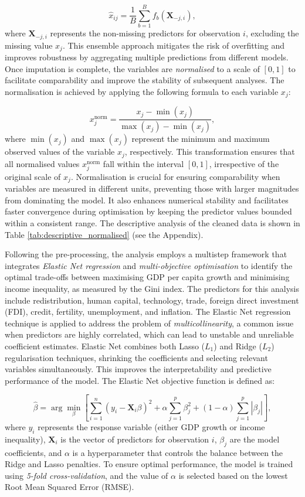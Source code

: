 \[
\hat{x}_{ij} = \frac{1}{B} \sum_{b=1}^{B} f_b(\mathbf{X}_{-j,i}),
\]
where \(\mathbf{X}_{-j,i}\) represents the non-missing predictors for observation \(i\), excluding the missing value \(x_j\). This ensemble approach mitigates the risk of overfitting and improves robustness by aggregating multiple predictions from different models. 
Once imputation is complete, the variables are \textit{normalised} to a scale of \([0, 1]\) to facilitate comparability and improve the stability of subsequent analyses. The normalisation is achieved by applying the following formula to each variable \(x_j\):

\[
x_j^{\text{norm}} = \frac{x_j - \min(x_j)}{\max(x_j) - \min(x_j)},
\]
where \(\min(x_j)\) and \(\max(x_j)\) represent the minimum and maximum observed values of the variable \(x_j\), respectively. This transformation ensures that all normalised values \(x_j^{\text{norm}}\) fall within the interval \([0, 1]\), irrespective of the original scale of \(x_j\). Normalisation is crucial for ensuring comparability when variables are measured in different units, preventing those with larger magnitudes from dominating the model. It also enhances numerical stability and facilitates faster convergence during optimisation by keeping the predictor values bounded within a consistent range. The descriptive analysis of the cleaned data is shown in Table \ref{tab:descriptive_normalised} (see the Appendix).

Following the pre-processing, the analysis employs a multistep framework that integrates \textit{Elastic Net regression} and \textit{multi-objective optimisation} to identify the optimal trade-offs between maximising GDP per capita growth and minimising income inequality, as measured by the Gini index. The predictors for this analysis include redistribution, human capital, technology, trade, foreign direct investment (FDI), credit, fertility, unemployment, and inflation. The Elastic Net regression technique is applied to address the problem of \textit{multicollinearity}, a common issue when predictors are highly correlated, which can lead to unstable and unreliable coefficient estimates. Elastic Net combines both Lasso (\(L_1\)) and Ridge (\(L_2\)) regularisation techniques, shrinking the coefficients and selecting relevant variables simultaneously. This improves the interpretability and predictive performance of the model. The Elastic Net objective function is defined as:

\[
\hat{\beta} = \arg \min_{\beta} \left[ \sum_{i=1}^{n} \left( y_i - \mathbf{X}_i \beta \right)^2 + \alpha \sum_{j=1}^{p} \beta_j^2 + (1-\alpha) \sum_{j=1}^{p} |\beta_j| \right],
\]
where \(y_i\) represents the response variable (either GDP growth or income inequality), \(\mathbf{X}_i\) is the vector of predictors for observation \(i\), \(\beta_j\) are the model coefficients, and \(\alpha\) is a hyperparameter that controls the balance between the Ridge and Lasso penalties. To ensure optimal performance, the model is trained using \textit{5-fold cross-validation}, and the value of \(\alpha\) is selected based on the lowest Root Mean Squared Error (RMSE). 

